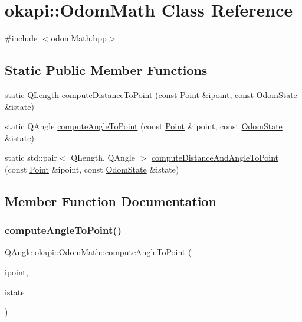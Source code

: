 \hypertarget{classokapi_1_1OdomMath}{}\section{okapi\+::Odom\+Math Class Reference}
\label{classokapi_1_1OdomMath}


{\ttfamily \#include $<$odom\+Math.\+hpp$>$}

\subsection*{Static Public Member Functions}
\begin{DoxyCompactItemize}
\item 
static Q\+Length \mbox{\hyperlink{classokapi_1_1OdomMath_a58abbf02061a774eb292cc62a0371afa}{compute\+Distance\+To\+Point}} (const \mbox{\hyperlink{structokapi_1_1Point}{Point}} \&ipoint, const \mbox{\hyperlink{structokapi_1_1OdomState}{Odom\+State}} \&istate)
\item 
static Q\+Angle \mbox{\hyperlink{classokapi_1_1OdomMath_a993603bff1e35c0270cdfdab1196c695}{compute\+Angle\+To\+Point}} (const \mbox{\hyperlink{structokapi_1_1Point}{Point}} \&ipoint, const \mbox{\hyperlink{structokapi_1_1OdomState}{Odom\+State}} \&istate)
\item 
static std\+::pair$<$ Q\+Length, Q\+Angle $>$ \mbox{\hyperlink{classokapi_1_1OdomMath_a97865973f203ed07eb8f642fea344c23}{compute\+Distance\+And\+Angle\+To\+Point}} (const \mbox{\hyperlink{structokapi_1_1Point}{Point}} \&ipoint, const \mbox{\hyperlink{structokapi_1_1OdomState}{Odom\+State}} \&istate)
\end{DoxyCompactItemize}


\subsection{Member Function Documentation}
\mbox{\label{classokapi_1_1OdomMath_a993603bff1e35c0270cdfdab1196c695}} 
\subsubsection{\texorpdfstring{computeAngleToPoint()}{computeAngleToPoint()}}
{\footnotesize\ttfamily Q\+Angle okapi\+::\+Odom\+Math\+::compute\+Angle\+To\+Point (\begin{DoxyParamCaption}\item[{const \mbox{\hyperlink{structokapi_1_1Point}{Point}} \&}]{ipoint,  }\item[{const \mbox{\hyperlink{structokapi_1_1OdomState}{Odom\+State}} \&}]{istate }\end{DoxyParamCaption})\hspace{0.3cm}{\ttfamily [static]}}

